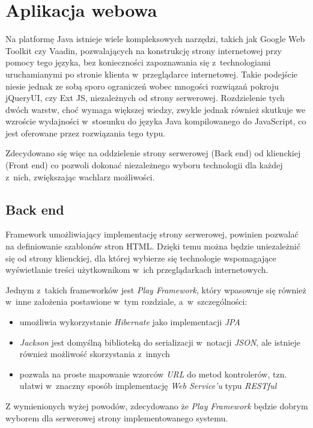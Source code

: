 \documentclass[11pt]{aghdpl}
\begin{document}
\section{Aplikacja webowa}

Na platformę Java istnieje wiele kompleksowych narzędzi, takich jak Google Web Toolkit czy Vaadin, pozwalających na konstrukcję strony internetowej przy pomocy tego języka, bez konieczności zapoznawania się z~technologiami uruchamianymi po stronie klienta w~przeglądarce internetowej. Takie podejście niesie jednak ze sobą sporo ograniczeń wobec mnogości rozwiązań pokroju jQueryUI, czy Ext JS, niezależnych od strony serwerowej. Rozdzielenie tych dwóch warstw, choć wymaga większej wiedzy, zwykle jednak również skutkuje we wzroście wydajności w~stosunku do języka Java kompilowanego do JavaScript, co jest oferowane przez rozwiązania tego typu.

Zdecydowano się więc na oddzielenie strony serwerowej (Back end) od klienckiej (Front end) co pozwoli dokonać niezależnego wyboru technologii dla każdej z~nich, zwiększając wachlarz możliwości.

\subsection{Back end}

Framework umożliwiający implementację strony serwerowej, powinien pozwalać na definiowanie szablonów stron HTML. Dzięki temu można będzie uniezależnić się od strony klienckiej, dla której wybierze się technologie wspomagające wyświetlanie treści użytkownikom w~ich przeglądarkach internetowych.

Jednym z~takich frameworków jest \emph{Play Framework}, który wpasowuje się również w~inne założenia postawione w~tym rozdziale, a~w~szczególności:

\begin{itemize}
	\item umożliwia wykorzystanie \emph{Hibernate} jako implementacji \emph{JPA}
	\item \emph{Jackson} jest domyślną biblioteką do serializacji w~notacji \emph{JSON}, ale istnieje również możliwość skorzystania z~innych
	\item pozwala na proste mapowanie wzorców \emph{URL} do metod kontrolerów, tzn. ułatwi w~znaczny sposób implementację \emph{Web Service'u} typu \emph{RESTful}
\end{itemize}

Z wymienionych wyżej powodów, zdecydowano że \emph{Play Framework} będzie dobrym wyborem dla serwerowej strony implementowanego systemu.
\end{document}
